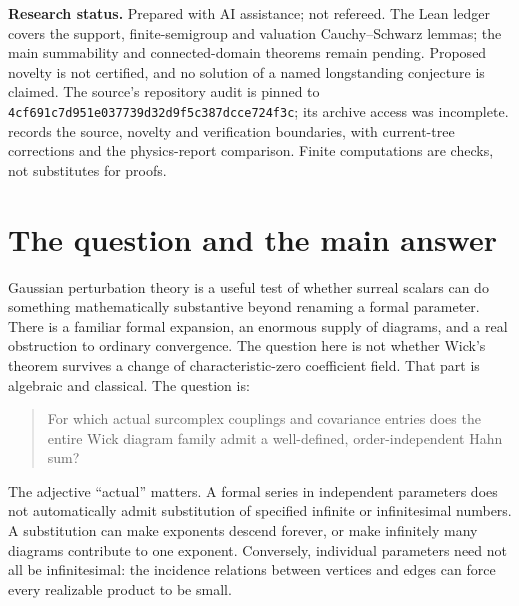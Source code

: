 \documentclass[11pt,letterpaper]{article}
\numberwithin{equation}{section}
\theoremstyle{definition}
\theoremstyle{remark}
\newcommand{\Commit}{\nolinkurl{4cf691c7d951e037739d32d9f5c387dcce724f3c}}
\begin{document}
\begin{titlepage}
\begin{minipage}{0.94\textwidth}
\begin{abstract}
The results allow arbitrary-rank divisible ordered value groups and arbitrary
Hahn-unit tails. They specialize to surreal and surcomplex numbers through
Conway normal forms. Full mathematical proofs, an exact rational and
lexicographic certificate solver, and 7,684 reproducible finite checks are
provided. Classical Wick calculus and support lemmas are explicitly separated
from the proposed new finite-certificate theorem package. Everything here is
mathematics about finite-dimensional formal Gaussian expansions over a Hahn
field; a Hahn value is not an integral, a measure or a physical amplitude,
and no claim about physics is made.
\end{abstract}
\end{minipage}
\vfill
\begin{minipage}{0.94\textwidth}\small
\textbf{Research status.} Prepared with AI assistance; not refereed.
The Lean ledger covers the support, finite-semigroup and valuation
Cauchy--Schwarz lemmas; the main summability and connected-domain theorems
remain pending. Proposed novelty is not certified, and no solution of a
named longstanding conjecture is claimed. The source's repository audit is
pinned to \Commit; its archive access was incomplete.
 records the source, novelty and verification
boundaries, with current-tree corrections and the physics-report comparison.
Finite computations are checks, not substitutes for proofs.
\end{minipage}
\end{titlepage}
\hypersetup{pageanchor=true}
\begingroup\small\setlength{\parskip}{0pt}
\tableofcontents
\endgroup
\clearpage
{}

\section{The question and the main answer}
\label{wick:sec:intro}

Gaussian perturbation theory is a useful test of whether surreal scalars can
do something mathematically substantive beyond renaming a formal parameter.
There is a familiar formal expansion, an enormous supply of diagrams, and a
real obstruction to ordinary convergence. The question here is not whether
Wick's theorem survives a change of characteristic-zero coefficient field.
That part is algebraic and classical. The question is:
\begin{quote}
For which actual surcomplex couplings and covariance entries does the entire
Wick diagram family admit a well-defined, order-independent Hahn sum?
\end{quote}
The adjective ``actual'' matters. A formal series in independent parameters
does not automatically admit substitution of specified infinite or
infinitesimal numbers. A substitution can make exponents descend forever,
or make infinitely many diagrams contribute to one exponent. Conversely,
individual parameters need not all be infinitesimal: the incidence relations
between vertices and edges can force every realizable product to be small.
\end{document}
